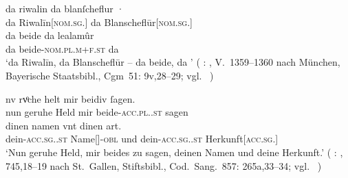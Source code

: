 \begin{exe}
\ex \label{ex:askedal73pr}
	\begin{xlist}
	\ex \label{ex:askedal73pr_1}
		\gll da riwalin da {blanſcheflur ·} \\
			da Riwalīn[\textsc{nom.sg.\MascM}] da
				Blanscheflūr[\textsc{nom.sg.\FemF}] \\
	\sn \gll da beide da lealamûr \\
			da beide-\textsc{nom.pl.m+f\subMF.st} da  \\
		\trans `da Riwalīn, da Blanscheflūr -- da beide, da '
			(%
				: , V.~1359--1360
				nach München, Bayerische Staatsbibl., Cgm~51: 9v,28--29;
				vgl.~\cite[22]{maroldschroeder1969}%
			)

	\ex \label{ex:askedal73pr_2}
		\gll nv rvͦche helt mir beidiv ſagen. \\
			nun geruhe Held mir beide-\textsc{acc.pl.\NeutI.st} sagen \\
	\sn \gll dinen namen vnt dinen art. \\
			dein-\textsc{acc.sg.\MascI.st} Name[\textsc{\MascI}]-\textsc{obl}
			und dein-\textsc{acc.sg.\MascI.st}
			Herkunft[\textsc{acc.sg.\MascI}] \\
		\trans `Nun geruhe Held, mir beides zu sagen, deinen Namen und
			deine Herkunft.'\footnotemark{}
			(%
				: , 745,18--19
				nach St.~Gallen, Stiftsbibl., Cod.~Sang.~857: 265a,33--34;
				vgl.~\cite[749]{knechtschirok2003}%
			)
	\end{xlist}
\end{exe}
%

